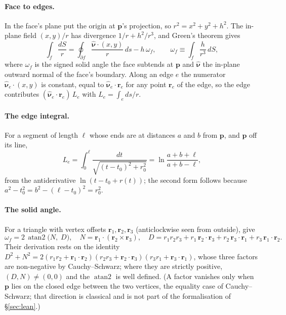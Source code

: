 \documentclass[10pt,a4paper]{article}
\newcommand{\vr}{\mathbf{r}}
\newcommand{\vnu}{\hat{\boldsymbol\nu}}
\begin{document}
\paragraph{Face to edges.} In the face's plane put the origin at $\mathbf{p}$'s projection, so
$r^2 = x^2+y^2+h^2$. The in-plane field $(x,y)/r$ has divergence $1/r + h^2/r^3$, and Green's
theorem gives
\begin{equation}
\int_f\frac{dS}{r} = \oint_{\partial f}\frac{\vnu\cdot(x,y)}{r}\,ds - h\,\omega_f,\qquad
\omega_f \equiv \int_f\frac{h}{r^3}\,dS,
\label{eq:green}
\end{equation}
where $\omega_f$ is the signed solid angle the face subtends at $\mathbf{p}$ and $\vnu$ the in-plane
outward normal of the face's boundary. Along an edge $e$ the numerator $\vnu_e\cdot(x,y)$ is
constant, equal to $\vnu_e\cdot\vr_e$ for any point $\vr_e$ of the edge, so the edge contributes
$(\vnu_e\cdot\vr_e)\,L_e$ with $L_e = \int_e ds/r$.

\paragraph{The edge integral.} For a segment of length $\ell$ whose ends are at distances $a$ and $b$
from $\mathbf{p}$, and $\mathbf{p}$ off its line,
\begin{equation}
L_e = \int_0^\ell\frac{dt}{\sqrt{(t-t_0)^2+r_0^2}} = \ln\frac{a+b+\ell}{a+b-\ell},
\label{eq:edge}
\end{equation}
from the antiderivative $\ln(t-t_0+r(t))$; the second form follows because
$a^2-t_0^2 = b^2-(\ell-t_0)^2 = r_0^2$.

\paragraph{The solid angle.} For a triangle with vertex offsets $\vr_1,\vr_2,\vr_3$ (anticlockwise
seen from outside), \citet{vanoosterom1983} give
\begin{equation}
\omega_f = 2\,\operatorname{atan2}\bigl(N,\;D\bigr),\quad
N = \vr_1\cdot(\vr_2\times\vr_3),\quad D = r_1r_2r_3 + r_1\,\vr_2\cdot\vr_3 + r_2\,\vr_3\cdot\vr_1 + r_3\,\vr_1\cdot\vr_2.
\label{eq:vos}
\end{equation}
Their derivation rests on the identity
$D^2+N^2 = 2(r_1r_2+\vr_1\cdot\vr_2)(r_2r_3+\vr_2\cdot\vr_3)(r_3r_1+\vr_3\cdot\vr_1)$, whose three
factors are non-negative by Cauchy--Schwarz; where they are strictly positive, $(D,N)\neq(0,0)$ and the
$\operatorname{atan2}$ is well defined. (A factor vanishes only when $\mathbf{p}$ lies on the closed
edge between the two vertices, the equality case of Cauchy--Schwarz; that direction is classical
and is not part of the formalisation of \S\ref{sec:lean}.)
\end{document}
